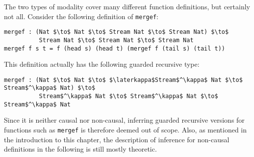 The two types of modality cover many different function definitions, but
certainly not all. Consider the following definition of \texttt{mergef}:
\begin{lstlisting}[mathescape,title=\idrisBlock]
mergef : (Nat $\to$ Nat $\to$ Stream Nat $\to$ Stream Nat) $\to$ 
          Stream Nat $\to$ Stream Nat $\to$ Stream Nat
mergef f s t = f (head s) (head t) (mergef f (tail s) (tail t))
\end{lstlisting}
This definition actually has the following guarded recursive type:
\begin{lstlisting}[mathescape,title=\ttBlock]
mergef : (Nat $\to$ Nat $\to$ $\laterkappa$Stream$^\kappa$ Nat $\to$ Stream$^\kappa$ Nat) $\to$ 
          Stream$^\kappa$ Nat $\to$ Stream$^\kappa$ Nat $\to$ Stream$^\kappa$ Nat
\end{lstlisting}
Since it is neither causal nor non-causal, inferring guarded recursive versions
for functions such as \texttt{mergef} is therefore deemed out of
scope. Also, as mentioned in the introduction to this chapter, the description of
inference for non-causal definitions in the following is still mostly theoretic.







